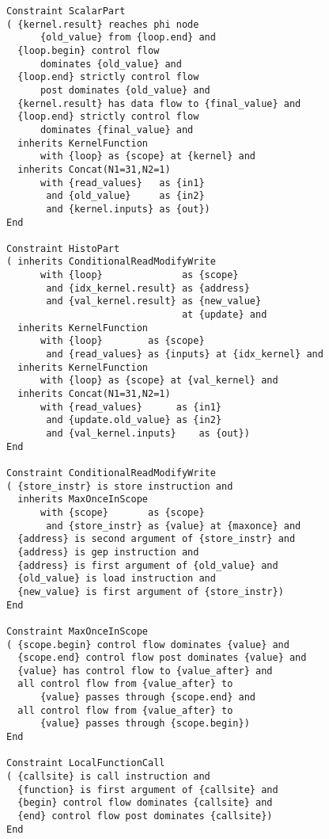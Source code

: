 \begin{figure}[p]
\begin{lstlisting}[language=IDL,basicstyle=\linespread{0.8}\small\ttfamily,
                   firstnumber=42]
Constraint ScalarPart
( {kernel.result} reaches phi node
      {old_value} from {loop.end} and
  {loop.begin} control flow
      dominates {old_value} and
  {loop.end} strictly control flow
      post dominates {old_value} and
  {kernel.result} has data flow to {final_value} and
  {loop.end} strictly control flow
      dominates {final_value} and
  inherits KernelFunction
      with {loop} as {scope} at {kernel} and
  inherits Concat(N1=31,N2=1)
      with {read_values}   as {in1}
       and {old_value}     as {in2}
       and {kernel.inputs} as {out})
End

Constraint HistoPart
( inherits ConditionalReadModifyWrite
      with {loop}              as {scope}
       and {idx_kernel.result} as {address}
       and {val_kernel.result} as {new_value}
                               at {update} and
  inherits KernelFunction
      with {loop}        as {scope}
       and {read_values} as {inputs} at {idx_kernel} and
  inherits KernelFunction
      with {loop} as {scope} at {val_kernel} and
  inherits Concat(N1=31,N2=1)
      with {read_values}      as {in1}
       and {update.old_value} as {in2}
       and {val_kernel.inputs}    as {out})
End

Constraint ConditionalReadModifyWrite
( {store_instr} is store instruction and
  inherits MaxOnceInScope
      with {scope}       as {scope}
       and {store_instr} as {value} at {maxonce} and
  {address} is second argument of {store_instr} and
  {address} is gep instruction and
  {address} is first argument of {old_value} and
  {old_value} is load instruction and
  {new_value} is first argument of {store_instr})
End

Constraint MaxOnceInScope
( {scope.begin} control flow dominates {value} and
  {scope.end} control flow post dominates {value} and
  {value} has control flow to {value_after} and
  all control flow from {value_after} to
      {value} passes through {scope.end} and
  all control flow from {value_after} to
      {value} passes through {scope.begin})
End

Constraint LocalFunctionCall
( {callsite} is call instruction and
  {function} is first argument of {callsite} and
  {begin} control flow dominates {callsite} and
  {end} control flow post dominates {callsite})
End
\end{lstlisting}
\end{figure}
